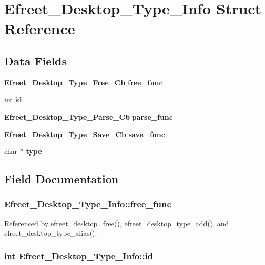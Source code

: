 \section{Efreet\_\-Desktop\_\-Type\_\-Info Struct Reference}
\label{structEfreet__Desktop__Type__Info}
\subsection*{Data Fields}
\begin{CompactItemize}
\item 
{\bf Efreet\_\-Desktop\_\-Type\_\-Free\_\-Cb} {\bf free\_\-func}
\item 
int {\bf id}
\item 
{\bf Efreet\_\-Desktop\_\-Type\_\-Parse\_\-Cb} {\bf parse\_\-func}
\item 
{\bf Efreet\_\-Desktop\_\-Type\_\-Save\_\-Cb} {\bf save\_\-func}
\item 
char $\ast$ {\bf type}
\end{CompactItemize}


\subsection{Field Documentation}
\subsubsection{ {\bf Efreet\_\-Desktop\_\-Type\_\-Info::free\_\-func}}\label{structEfreet__Desktop__Type__Info_1426b2c43ca58b98490b577e481f5af9}




Referenced by efreet\_\-desktop\_\-free(), efreet\_\-desktop\_\-type\_\-add(), and efreet\_\-desktop\_\-type\_\-alias().
\subsubsection{\setlength{\rightskip}{0pt plus 5cm}int {\bf Efreet\_\-Desktop\_\-Type\_\-Info::id}}\label{structEfreet__Desktop__Type__Info_cab73ad804a54b8f85030cf356c1c047}





